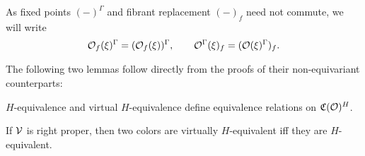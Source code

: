 \documentclass[a4paper,10pt
]{article}%
\newcommand{\I}{\mathbb I}
\newcommand{\J}{\mathbb J}
\renewcommand{\1}{\ensuremath{\mathbb{id}}}
\begin{document}
\begin{notation}
      As fixed points $(-)^\Gamma$ and fibrant replacement $(-)_f$ need not commute, we will write
      \begin{equation}
            \mathcal{O}_f(\xi)^\Gamma = (\mathcal{O}_f(\xi))^\Gamma,
            \qquad
            \mathcal{O}^\Gamma(\xi)_f = (\mathcal{O}(\xi)^{\Gamma})_f.
      \end{equation}
\end{notation}



The following two lemmas follow directly from the proofs of their non-equivariant counterparts:
\begin{lemma}
      \label{CAV_4.10_LEM}
      $H$-equivalence and virtual $H$-equivalence define equivalence relations on $\mathfrak C(\mathcal{O})^H$.
\end{lemma}

        
        
        


\begin{lemma}
      \label{RIGHTPROPER_LEM}
      If $\mathcal V$ is right proper, then two colors are virtually $H$-equivalent iff they are $H$-equivalent. 
\end{lemma}
\end{document}

